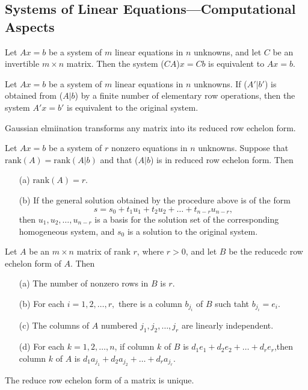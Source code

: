 \subsection{Systems of Linear Equations---Computational Aspects}
\begin{theorem}
    Let \( Ax = b \) be a system of \( m \) linear equations in \( n \) unknowns, and let \( C \) be an invertible \( m \times n \) matrix. Then the system (\(CA\))\(x = Cb \) is equivalent to \( Ax = b \).
\end{theorem}
\vspace{4cm}
\begin{corollary}
    Let \( Ax = b \) be a system of \( m \) linear equations in \( n \) unknowns.
    If (\(A'|b'\)) is obtained from (\(A |b\)) by a finite number of elementary row operations, then the system \( A'x = b' \) is equivalent to the original system.
\end{corollary}
\vspace{4cm}
\begin{theorem}
    Gaussian elmiination transforms any matrix into its reduced row echelon form.
\end{theorem}
\begin{theorem}
    Let \(Ax = b \) be a system of \( r \) nonzero equations in \( n \) unknowns. Suppose that \(\text{rank}(A) = \text{rank}(A|b)\) and that (\(A|b\)) is in reduced row echelon form. Then
    \begin{enumerate}
        \item[(a)] \(\text{rank}(A) = r \).
        \item[(b)] If the general solution obtained by the procedure above is of the form
        \[
        s = s_0 + t_1 u_1 + t_2 u_2 + \dots + t_{n-r} u_{n-r},
        \]
        then {\(u_1,u_2,\dots , u_{n-r}\)} is a basis for the solution set of the corresponding homogeneous system, and \( s_0 \) is a solution to the original system.
    \end{enumerate}
\end{theorem}
\vspace{5cm}
\begin{theorem}
    Let \(A\) be an \(m\times n\) matrix of rank \(r\), where \(r > 0\), and let \( B \) be the reducedc row echelon form of \( A \). Then
\begin{enumerate}
    \item[(a)] The number of nonzero rows in \( B \) is \(r\).
    \item[(b)] For each \( i = 1, 2, \dots , r ,\) there is a column \(b_{j_i}\) of \(B\) such taht \(b_{j_i} = e_i \).
    \item[(c)] The columns of \( A \) numbered \( j_1, j_2, \dots , j_r \) are linearly independent.
    \item[(d)] For each \( k = 1, 2, \dots, n \), if column \(k\) of \(B \) is \(d_1 e_1 + d_2 e_2 + \dots + d_r e_r \),then column \( k \) of \(A \) is \(d_1 a_{j_1}+d_2 a_{j_2} + \dots + d_r a_{j_r} \).
\end{enumerate}
\end{theorem}
\begin{theorem}
    The reduce row echelon form of a matrix is unique.
\end{theorem}
\vspace{3cm}